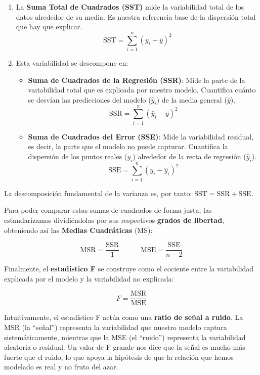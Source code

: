 \documentclass[
  letterpaper,
  DIV=11,
  numbers=noendperiod]{scrreprt}
\providecommand{\tightlist}{%
  \setlength{\itemsep}{0pt}\setlength{\parskip}{0pt}}
\begin{document}
\begin{enumerate}
\def\labelenumi{\arabic{enumi}.}
\item
  La \textbf{Suma Total de Cuadrados (SST)} mide la variabilidad total
  de los datos alrededor de su media. Es nuestra referencia base de la
  dispersión total que hay que explicar. \[
  \text{SST} = \sum_{i=1}^{n} (y_i - \bar{y})^2
  \]
\item
  Esta variabilidad se descompone en:

  \begin{itemize}
  \tightlist
  \item
    \textbf{Suma de Cuadrados de la Regresión (SSR)}: Mide la parte de
    la variabilidad total que es explicada por nuestro modelo.
    Cuantifica cuánto se desvían las predicciones del modelo
    (\(\hat{y}_i\)) de la media general (\(\bar{y}\)). \[
      \text{SSR} = \sum_{i=1}^{n} (\hat{y}_i - \bar{y})^2
      \]
  \item
    \textbf{Suma de Cuadrados del Error (SSE)}: Mide la variabilidad
    residual, es decir, la parte que el modelo no puede capturar.
    Cuantifica la dispersión de los puntos reales (\(y_i\)) alrededor de
    la recta de regresión (\(\hat{y}_i\)). \[
      \text{SSE} = \sum_{i=1}^{n} (y_i - \hat{y}_i)^2
      \]
  \end{itemize}
\end{enumerate}

La descomposición fundamental de la varianza es, por tanto:
\(\text{SST} = \text{SSR} + \text{SSE}\).

Para poder comparar estas sumas de cuadrados de forma justa, las
estandarizamos dividiéndolas por sus respectivos \textbf{grados de
libertad}, obteniendo así las \textbf{Medias Cuadráticas} (MS):

\[
\text{MSR} = \frac{\text{SSR}}{1} \quad \quad \quad \text{MSE} = \frac{\text{SSE}}{n-2}
\]

Finalmente, el \textbf{estadístico F} se construye como el cociente
entre la variabilidad explicada por el modelo y la variabilidad no
explicada:

\[
F = \frac{\text{MSR}}{\text{MSE}}
\]

Intuitivamente, el estadístico F actúa como una \textbf{ratio de señal a
ruido}. La MSR (la ``señal'') representa la variabilidad que nuestro
modelo captura sistemáticamente, mientras que la MSE (el ``ruido'')
representa la variabilidad aleatoria o residual. Un valor de F grande
nos dice que la señal es mucho más fuerte que el ruido, lo que apoya la
hipótesis de que la relación que hemos modelado es real y no fruto del
azar.
\end{document}
